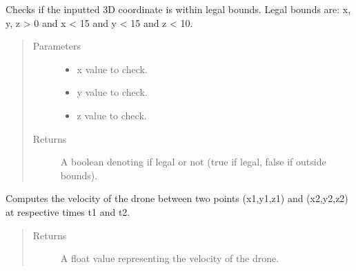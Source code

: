 \documentclass[letterpaper,10pt,english]{sphinxmanual}
\begin{document}
\begin{fulllineitems}
\label{\detokenize{index:src.Views.Graph.checkLegalInput}}
Checks if the inputted 3D coordinate is within legal bounds. Legal bounds are:
x, y, z \textgreater{} 0 and x \textless{} 15 and y \textless{} 15 and z \textless{} 10.
\begin{quote}\begin{description}
\item[{Parameters}] \leavevmode\begin{itemize}
\item {} 
 \textendash{} x value to check.

\item {} 
 \textendash{} y value to check.

\item {} 
 \textendash{} z value to check.

\end{itemize}

\item[{Returns}] \leavevmode
A boolean denoting if legal or not (true if legal, false if outside bounds).

\end{description}\end{quote}

\end{fulllineitems}


\begin{fulllineitems}
\label{\detokenize{index:src.Views.Graph.computeVelocity}}
Computes the velocity of the drone between two points (x1,y1,z1) and (x2,y2,z2) at respective times t1 and t2.
\begin{quote}\begin{description}
\item[{Returns}] \leavevmode
A float value representing the velocity of the drone.

\end{description}\end{quote}

\end{fulllineitems}
\end{document}
